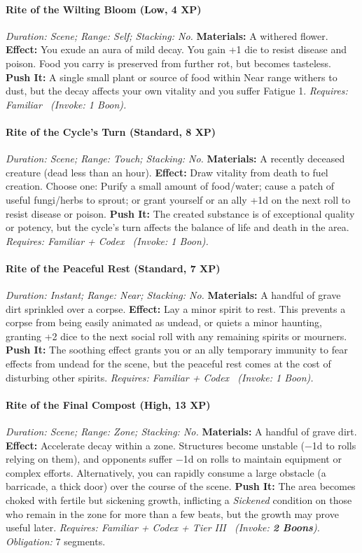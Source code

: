 \paragraph{Rite of the Wilting Bloom (Low, 4 XP)} \emph{Duration: Scene; Range: Self; Stacking: No.}
\textbf{Materials:} A withered flower.
\textbf{Effect:} You exude an aura of mild decay. You gain +1 die to resist disease and poison. Food you carry is preserved from further rot, but becomes tasteless.
\textbf{Push It:} A single small plant or source of food within Near range withers to dust, but the decay affects your own vitality and you suffer Fatigue 1.
\emph{Requires: Familiar \ (\textit{Invoke:} 1 Boon).}
\paragraph{Rite of the Cycle's Turn (Standard, 8 XP)} \emph{Duration: Scene; Range: Touch; Stacking: No.}
\textbf{Materials:} A recently deceased creature (dead less than an hour).
\textbf{Effect:} Draw vitality from death to fuel creation. Choose one: Purify a small amount of food/water; cause a patch of useful fungi/herbs to sprout; or grant yourself or an ally +1d on the next roll to resist disease or poison.
\textbf{Push It:} The created substance is of exceptional quality or potency, but the cycle's turn affects the balance of life and death in the area.
\emph{Requires: Familiar + Codex \ (\textit{Invoke:} 1 Boon).}
\paragraph{Rite of the Peaceful Rest (Standard, 7 XP)} \emph{Duration: Instant; Range: Near; Stacking: No.}
\textbf{Materials:} A handful of grave dirt sprinkled over a corpse.
\textbf{Effect:} Lay a minor spirit to rest. This prevents a corpse from being easily animated as undead, or quiets a minor haunting, granting +2 dice to the next social roll with any remaining spirits or mourners.
\textbf{Push It:} The soothing effect grants you or an ally temporary immunity to fear effects from undead for the scene, but the peaceful rest comes at the cost of disturbing other spirits.
\emph{Requires: Familiar + Codex \ (\textit{Invoke:} 1 Boon).}
\paragraph{Rite of the Final Compost (High, 13 XP)} \emph{Duration: Scene; Range: Zone; Stacking: No.}
\textbf{Materials:} A handful of grave dirt.
\textbf{Effect:} Accelerate decay within a zone. Structures become unstable (−1d to rolls relying on them), and opponents suffer −1d on rolls to maintain equipment or complex efforts. Alternatively, you can rapidly consume a large obstacle (a barricade, a thick door) over the course of the scene.
\textbf{Push It:} The area becomes choked with fertile but sickening growth, inflicting a \emph{Sickened} condition on those who remain in the zone for more than a few beats, but the growth may prove useful later.
\emph{Requires: Familiar + Codex + Tier III \ (\textit{Invoke:} \textbf{2 Boons}).}
\emph{Obligation:} 7 segments.

